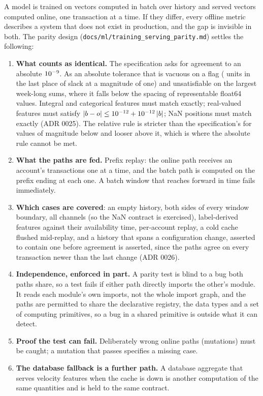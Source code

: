 A model is trained on vectors computed in batch over history and served vectors computed online,
one transaction at a time. If they differ, every offline metric describes a system that does
not exist in production, and the gap is invisible in both. The parity design
(\texttt{docs/ml/training\_serving\_parity.md}) settles the following:
\begin{enumerate}
  \item \textbf{What counts as identical.} The specification asks for agreement to an absolute
        $10^{-9}{}$. As an absolute tolerance that is vacuous on a flag (\nSlackUlps{}
        units in the last place of slack at a magnitude of one) and unsatisfiable on the largest
        week-long sums, where it falls below the spacing of representable float64 values.
        Integral and categorical features must match exactly; real-valued features must satisfy
        $|b - o| \le 10^{-12}{} + 10^{-12}{}\,|b|$; NaN positions must match exactly
        (ADR 0025). The relative rule is stricter than the specification's for values of magnitude
        below \nParityCrossover{} and looser above it, which is where the absolute rule cannot be
        met.
  \item \textbf{What the paths are fed.} Prefix replay: the online path receives an account's
        transactions one at a time, and the batch path is computed on the prefix ending at each
        one. A batch window that reaches forward in time fails immediately.
  \item \textbf{Which cases are covered}: an empty history, both sides of every window boundary, all
        \nChannels{} channels (so the NaN contract is exercised), label-derived features against
        their availability time, per-account replay, a cold cache flushed mid-replay, and a history
        that spans a configuration change, asserted to contain one before agreement is asserted,
        since the paths agree on every transaction newer than the last change (ADR 0026).
  \item \textbf{Independence, enforced in part.} A parity test is blind to a bug both paths share,
        so a test fails if either path directly imports the other's module. It reads each module's
        own imports, not the whole import graph, and the paths are permitted to share the
        declarative registry, the data types and a set of computing primitives, so a bug in a
        shared primitive is outside what it can detect.
  \item \textbf{Proof the test can fail.} Deliberately wrong online paths (mutations) must be
        caught; a mutation that passes specifies a missing case.
  \item \textbf{The database fallback is a further path.} A database aggregate that serves velocity
        features when the cache is down is another computation of the same quantities and is held
        to the same contract.
\end{enumerate}
